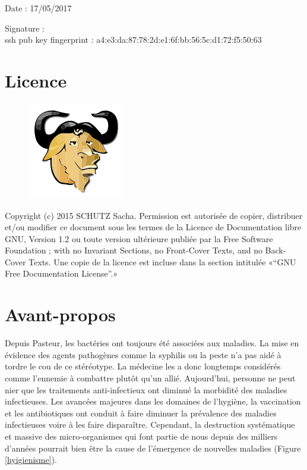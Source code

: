 \documentclass[12pt,a4paper]{article}
\begin{document}
Date : 17/05/2017

\vspace{0.5cm}

Signature : \\

ssh pub key fingerprint : a4:e3:da:87:78:2d:e1:6f:bb:56:5c:d1:72:f5:50:63
\vfill 

\section*{Licence}

\begin{figure}
\includegraphics[scale=0.5]{img/gfdl.png}\hfill
\end{figure}

Copyright (c) 2015 SCHUTZ Sacha. Permission est autorisée de copier,
distribuer et/ou modifier ce document sous les termes de la Licence de
Documentation libre GNU, Version 1.2 ou toute version ultérieure publiée
par la Free Software Foundation ; with no Invariant Sections, no
Front-Cover Texts, and no Back-Cover Texts. Une copie de la licence est
incluse dans la section intitulée «``GNU Free Documentation License''.»

\thispagestyle{empty} 
\setcounter{page}{0}
\thispagestyle{empty} 

\newpage

\tableofcontents
\newpage


\section{Avant-propos}

Depuis Pasteur, les bactéries ont toujours été associées aux maladies. La mise en évidence des agents pathogènes comme la syphilis ou la peste n'a pas aidé à tordre le cou de ce stéréotype. La médecine les a donc longtemps considérés comme l'ennemie à combattre plutôt qu'un allié. 
Aujourd'hui, personne ne peut nier que les traitements anti-infectieux ont diminué la morbidité des maladies infectieuses.
Les avancées majeures dans les domaines de l'hygiène, la vaccination et les antibiotiques ont conduit à faire diminuer la prévalence des maladies infectieuses voire à les faire disparaître. Cependant, la destruction systématique et massive des micro-organismes qui font partie de nous depuis des milliers d'années pourrait bien être la cause de l'émergence de nouvelles maladies\cite{Bach2002} (Figure \ref{hyigienisme}).
\end{document}
